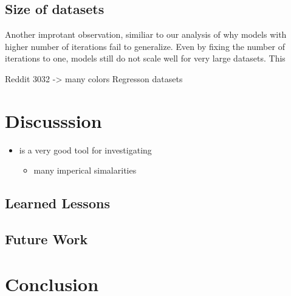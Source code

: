 \FloatBarrier
\subsection{Size of datasets}
Another improtant observation, similiar to our analysis of why \wlnn models with higher number of \wl iterations fail to generalize. Even by fixing the number of \wl iterations to one, \wlnn models still do not scale well for very large datasets. This

Reddit 3032 -> many colors
Regresson datasets

\FloatBarrier
\section{Discusssion}\label{sec:discussion}
\begin{itemize}
	\item \wlnn is a very good tool for investigating \gnns
	\begin{itemize}
		\item many imperical simalarities
	\end{itemize}
\end{itemize}

\subsection{Learned Lessons}
\subsection{Future Work}

\section{Conclusion}

\newpage


